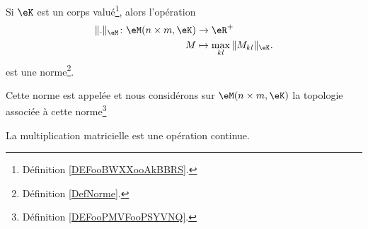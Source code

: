 \begin{lemmaDef}      \label{DEFooCQHDooYpUAhG}
    Si \( \eK\) est un corps valué\footnote{Définition \ref{DEFooBWXXooAkBBRS}.}, alors l'opération  
    \begin{equation}
        \begin{aligned}
            \| . \|_{\eM}\colon \eM(n\times m,\eK)&\to \eR^+ \\
            M&\mapsto  \max_{kl}\| M_{kl} \|_{\eK}.
        \end{aligned}
    \end{equation}
    est une norme\footnote{Définition \ref{DefNorme}.}.

    Cette norme est appelée  et nous considérons sur \( \eM(n\times m, \eK)\) la topologie associée à cette norme\footnote{Définition \ref{DEFooPMVFooPSYVNQ}.}
\end{lemmaDef}

\begin{proposition}     \label{PROPooOEETooPhqWuf}
    La multiplication matricielle est une opération continue.
\end{proposition}
